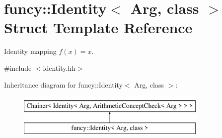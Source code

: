 \hypertarget{structfuncy_1_1Identity}{\section{funcy\-:\-:Identity$<$ Arg, class $>$ Struct Template Reference}
\label{structfuncy_1_1Identity}
}


Identity mapping $ f(x)=x $.  




{\ttfamily \#include $<$identity.\-hh$>$}

Inheritance diagram for funcy\-:\-:Identity$<$ Arg, class $>$\-:\begin{figure}[H]
\begin{center}
\leavevmode
\includegraphics[height=2.000000cm]{structfuncy_1_1Identity}
\end{center}
\end{figure}
